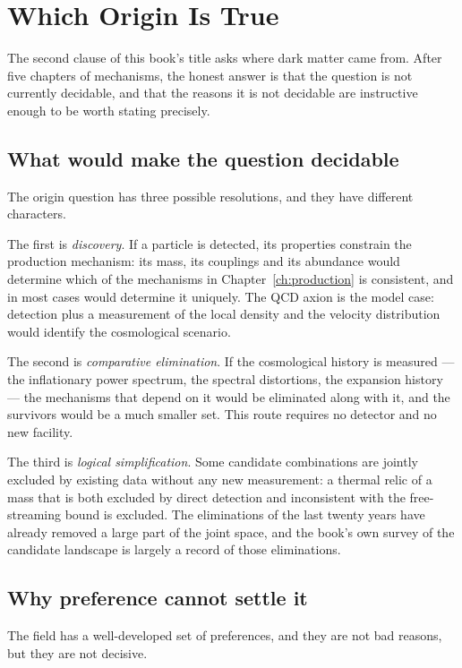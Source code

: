 
\chapter{Which Origin Is True}
\label{ch:origin}

The second clause of this book's title asks where dark matter came from.
After five chapters of mechanisms, the honest answer is that the question is
not currently decidable, and that the reasons it is not decidable are
instructive enough to be worth stating precisely.

\section{What would make the question decidable}The origin question has three
possible resolutions, and they have different characters.

The first is \emph{discovery}. If a particle is detected, its properties
constrain the production mechanism: its mass, its couplings and its
abundance would determine which of the mechanisms in Chapter~\ref{ch:production}
is consistent, and in most cases would determine it uniquely. The QCD axion
is the model case: detection plus a measurement of the local density and the
velocity distribution would identify the cosmological scenario.

The second is \emph{comparative elimination}. If the cosmological history is
measured --- the inflationary power spectrum, the spectral distortions, the
expansion history --- the mechanisms that depend on it would be eliminated
along with it, and the survivors would be a much smaller set. This route
requires no detector and no new facility.

The third is \emph{logical simplification}. Some candidate combinations are
jointly excluded by existing data without any new measurement: a thermal
relic of a mass that is both excluded by direct detection and inconsistent
with the free-streaming bound is excluded. The eliminations of the last
twenty years have already removed a large part of the joint space, and the
book's own survey of the candidate landscape is largely a record of those
eliminations.

\section{Why preference cannot settle it}The field has a well-developed set of
preferences, and they are not bad reasons, but they are not decisive.

